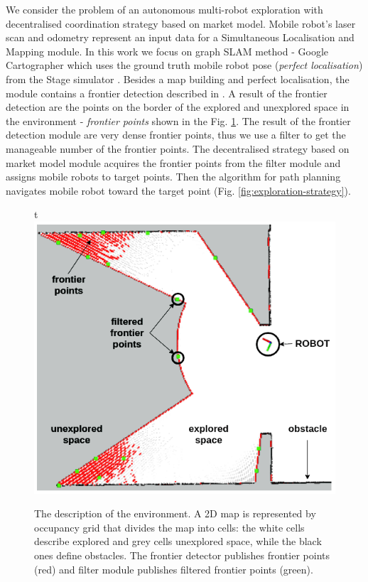 \documentclass[letterpaper, 10 pt, conference]{ieeeconf}  %
\begin{document}
We consider the problem of an autonomous multi-robot exploration with decentralised coordination strategy based on market model. Mobile robot's laser scan and odometry represent an input data for a Simultaneous Localisation and Mapping module. In this work we focus on graph SLAM method - Google Cartographer \cite{cartographer} which uses the ground truth mobile robot pose (\textit {perfect localisation}) from the Stage simulator \cite{Stage}. Besides a map building and perfect localisation, the module contains a frontier detection described in \cite{juraj}. A result of the frontier detection are the points on the border of the explored and unexplored space in the environment - \textit{frontier points} shown in the Fig. \ref{fig:environment}. The result of the frontier detection module are very dense frontier points, thus we use a filter to get the manageable number of the frontier points. The decentralised strategy based on market model module acquires the frontier points from the filter module and assigns mobile robots to target points. Then the algorithm for path planning navigates mobile robot toward the target point (Fig. \ref{fig:exploration-strategy}).      

\begin{figure}{t}
	\centering\includegraphics[width=0.85\columnwidth]{frontier_rviz_vol3.png}
	\caption {The description of the environment. A 2D map is represented by occupancy grid that divides the map into cells: the white cells describe explored and grey cells unexplored space, while the black ones define obstacles. The frontier detector publishes frontier points (red) and filter module publishes filtered frontier points (green).}
	\label{fig:environment}
\end{figure}
\end{document}
